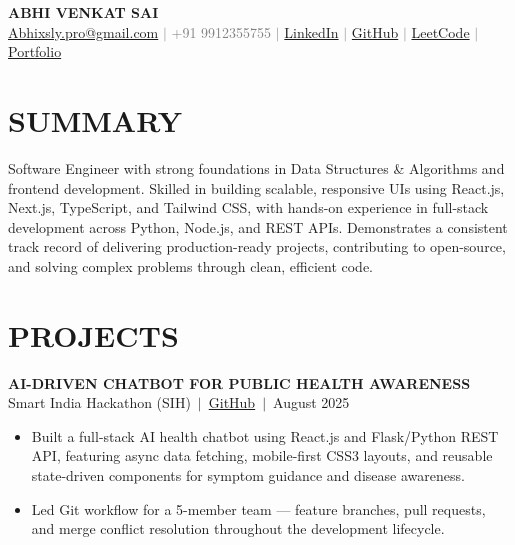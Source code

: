 \documentclass[a4paper,10pt]{article}
\newcommand{\rItem}[1]{\item\small#1}
\begin{document}

\begin{center}
  {\LARGE\bfseries\color{navyblue} ABHI VENKAT SAI}\\[4pt]
  \small
  \href{mailto:Abhixsly.pro@gmail.com}{Abhixsly.pro@gmail.com}
  \textcolor{graytext}{$|$ +91 9912355755 $|$}
  \href{https://linkedin.com/in/abhi-venkat-sai}{LinkedIn}
  \textcolor{graytext}{$|$}
  \href{https://github.com/Abhisly}{GitHub}
  \textcolor{graytext}{$|$}
  \href{https://leetcode.com/u/9ZmqAzoUJT/}{LeetCode}
  \textcolor{graytext}{$|$}
  \href{https://portfolio-nu-sage-28.vercel.app/}{Portfolio}
\end{center}

\vspace{1pt}

\section{SUMMARY}
\vspace{2pt}
\small
Software Engineer with strong foundations in Data Structures \& Algorithms and frontend development.
Skilled in building scalable, responsive UIs using React.js, Next.js, TypeScript, and Tailwind CSS, with
hands-on experience in full-stack development across Python, Node.js, and REST APIs. Demonstrates a
consistent track record of delivering production-ready projects, contributing to open-source, and solving
complex problems through clean, efficient code.

\section{PROJECTS}

\vspace{2pt}
{\bfseries\small AI-DRIVEN CHATBOT FOR PUBLIC HEALTH AWARENESS}\\[1pt]
{\footnotesize\color{graytext}Smart India Hackathon (SIH)\normalcolor~$|$~\href{https://github.com/Abhisly/AI-HEALTH-CHATBOT}{GitHub}\color{graytext}~$|$~August 2025}
\begin{itemize}
  \rItem{Built a full-stack AI health chatbot using React.js and Flask/Python REST API, featuring async data fetching, mobile-first CSS3 layouts, and reusable state-driven components for symptom guidance and disease awareness.}
  \rItem{Led Git workflow for a 5-member team --- feature branches, pull requests, and merge conflict resolution throughout the development lifecycle.}
\end{itemize}
\end{document}
